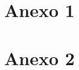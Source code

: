 \documentclass[
	12pt,				%
	openright,			%
	a4paper,			%
	english,			%
	french,				%
	spanish,			%
	brazil,				%
	]{abntex2}
\begin{document}

\begin{anexosenv}

\partanexos

\chapter{Anexo 1}

\chapter{Anexo 2}

\end{anexosenv}



\printindex
\end{document}
